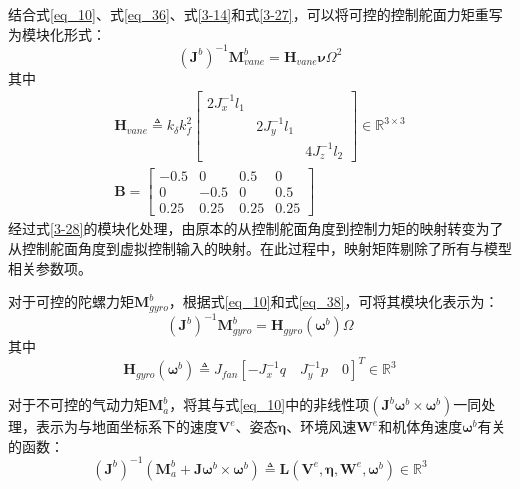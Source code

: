 结合式\eqref{eq_10}、式\eqref{eq_36}、式\eqref{3-14}和式\eqref{3-27}，可以将可控的控制舵面力矩重写为模块化形式：
\begin{equation}
    (\boldsymbol{J}^b)^{-1}\boldsymbol{M}_{vane}^b=\boldsymbol{H}_{vane}\boldsymbol{\nu}\Omega^2
    \label{3-28}
\end{equation}
其中
\begin{gather}
\left.\boldsymbol{H}_{vane}\triangleq k_{\delta}k_f^2\left[
    \begin{array}
    {ccc}2J_x^{-1}l_1 & & \\
        & 2J_y^{-1}l_1 & \\
        & & 4J_z^{-1}l_2
    \end{array}\right.\right]\in\mathbb{R}^{3\times3}
    \label{3-29}\\
    \boldsymbol{B}=
    \begin{bmatrix}
    -0.5 & 0 & 0.5 & 0 \\
    0 & -0.5 & 0 & 0.5 \\
    0.25 & 0.25 & 0.25 & 0.25
    \end{bmatrix}
    \label{3-30}
\end{gather}
经过式\eqref{3-28}的模块化处理，由原本的从控制舵面角度到控制力矩的映射转变为了从控制舵面角度到虚拟控制输入的映射。在此过程中，映射矩阵剔除了所有与模型相关参数项。

对于可控的陀螺力矩$\boldsymbol{M}_{gyro}^b$，根据式\eqref{eq_10}和式\ref{eq_38}，可将其模块化表示为：
\begin{equation}
    (\boldsymbol{J}^b)^{-1}\boldsymbol{M}_{gyro}^b=\boldsymbol{H}_{gyro}(\boldsymbol{\omega}^b)\Omega
    \label{3-31}
\end{equation}
其中
\begin{equation}
    \boldsymbol{H}_{gyro}(\boldsymbol{\omega}^b) \triangleq J_{fan}[-J_x^{-1}q\quad J_y^{-1}p\quad0]^T\in\mathbb{R}^{3}
    \label{3-32}
\end{equation}

对于不可控的气动力矩$\boldsymbol{M}_{a}^b$，将其与式\eqref{eq_10}中的非线性项$(\boldsymbol{J}^b\boldsymbol{\omega}^b\times\boldsymbol{\omega}^b)$一同处理，表示为与地面坐标系下的速度$\boldsymbol{V}^e$、姿态$\boldsymbol{\eta}$、环境风速$\boldsymbol{W}^e$和机体角速度$\boldsymbol{\omega}^b$有关的函数：
\begin{equation}
    ({\boldsymbol{J}^b})^{-1}(\boldsymbol{M}_{a}^b+\boldsymbol{J}\boldsymbol{\omega}^b\times\boldsymbol{\omega}^b)\triangleq \boldsymbol{L}(\boldsymbol{V}^e,\boldsymbol{\eta},\boldsymbol{W}^e,\boldsymbol{\omega}^b)\in\mathbb{R}^3
    \label{3-33}
\end{equation}

